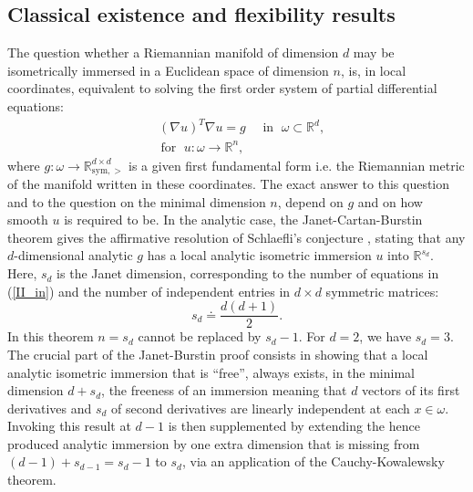 \documentclass[reqno,twoside,11pt]{amsart}
\newcommand{\sym}{\mathrm{sym}}
\newcommand{\R}{\mathbb{R}}
\numberwithin{equation}{section}
\theoremstyle{plain}
\theoremstyle{definition}
\begin{document}
\subsection{Classical existence and flexibility results} 
The question whether a Riemannian manifold of dimension $d$ may be
isometrically immersed in a Euclidean space of 
dimension $n$, is, in local coordinates, equivalent to solving
the first order system of partial differential equations:
\begin{equation}\label{II_in}
\begin{split}
& (\nabla u)^T\nabla u = g \quad \text{ in } \; \omega \subset \R^d,\\
& \, \mbox{for }\; u:\omega\to\R^n,
\end{split}
\end{equation}
where $g:\omega\to\R^{d\times d}_{\sym,>}$ is a given
first fundamental form i.e. the Riemannian metric of the manifold
written in these coordinates. The exact answer to this question and to the
question on the minimal dimension $n$, depend on $g$ and on how smooth $u$
is required to be. In the analytic case, the Janet-Cartan-Burstin theorem
\cite{Janet, Cartan, Bur} gives the affirmative
resolution of Schlaefli's conjecture \cite{Scha}, stating that any
$d$-dimensional analytic $g$ has a local analytic
iso\-met\-ric immersion $u$ into $\R^{s_d}$. Here, $s_d$ is the  Janet
dimension, corresponding to the number of equations in (\ref{II_in})
and the number of independent entries in $d\times d$ symmetric matrices:
\begin{equation}\label{SD}
s_d \doteq \frac{d(d+1)}{2}.
\end{equation}
In this theorem $n=s_d$ cannot be replaced by
$s_d-1$. For $d=2$, we have $s_d=3$. The crucial part of the
Janet-Burstin proof consists in showing that a local analytic
isometric immersion that
is ``free'', always exists, in the minimal dimension 
$d+s_d$, the freeness of an
immersion meaning that $d$ vectors of its first derivatives and $s_d$ of second
derivatives are linearly independent at each $x\in \omega$. Invoking this 
result at $d-1$ is then supplemented by extending the hence produced
analytic immersion by one extra
dimension that is missing from $(d-1)+s_{d-1} = s_d-1$ to $s_d$, via an
application of the Cauchy-Kowalewsky theorem.

\medskip
\end{document}
